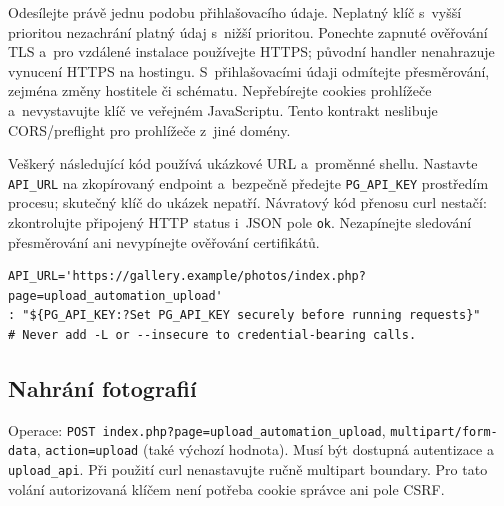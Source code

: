 \documentclass[11pt,a4paper]{article}
\newcommand{\codeword}[1]{\nolinkurl{#1}}
\begin{document}
Odesílejte právě jednu podobu přihlašovacího údaje. Neplatný klíč s~vyšší prioritou
nezachrání platný údaj s~nižší prioritou. Ponechte zapnuté ověřování TLS a~pro vzdálené
instalace používejte HTTPS; původní handler nenahrazuje vynucení HTTPS na hostingu.
S~přihlašovacími údaji odmítejte přesměrování, zejména změny hostitele či schématu.
Nepřebírejte cookies prohlížeče a~nevystavujte klíč ve veřejném JavaScriptu. Tento kontrakt
neslibuje CORS/preflight pro prohlížeče z~jiné domény.

Veškerý následující kód používá ukázkové URL a~proměnné shellu. Nastavte \codeword{API_URL}
na zkopírovaný endpoint a~bezpečně předejte \codeword{PG_API_KEY} prostředím procesu;
skutečný klíč do ukázek nepatří. Návratový kód přenosu curl nestačí: zkontrolujte připojený
HTTP status i~JSON pole \codeword{ok}. Nezapínejte sledování přesměrování ani nevypínejte
ověřování certifikátů.

\begin{lstlisting}[language={}]
API_URL='https://gallery.example/photos/index.php?page=upload_automation_upload'
: "${PG_API_KEY:?Set PG_API_KEY securely before running requests}"
# Never add -L or --insecure to credential-bearing calls.
\end{lstlisting}

\subsection{\texorpdfstring{Nahrání fotografií}{Nahrání fotografií}}

\label{api352:upload}

Operace: \codeword{POST index.php?page=upload_automation_upload},
\codeword{multipart/form-data}, \codeword{action=upload} (také výchozí hodnota). Musí být
dostupná autentizace a \codeword{upload_api}. Při použití curl nenastavujte ručně multipart
boundary. Pro tato volání autorizovaná klíčem není potřeba cookie správce ani pole CSRF.
\end{document}
